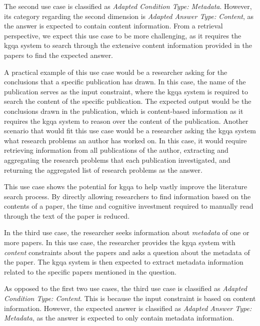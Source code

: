 The second use case is classified as \emph{Adapted Condition Type: Metadata}. However, its category regarding the second dimension is \emph{Adapted Answer Type: Content}, as the answer is expected to contain content information. From a retrieval perspective, we expect this use case to be more challenging, as it requires the \gls{kgqa} system to search through the extensive content information provided in the papers to find the expected answer.

A practical example of this use case would be a researcher asking for the conclusions that a specific publication has drawn. In this case, the name of the publication serves as the input constraint, where the \gls{kgqa} system is required to search the content of the specific publication. The expected output would be the conclusions drawn in the publication, which is content-based information as it requires the \gls{kgqa} system to reason over the content of the publication. Another scenario that would fit this use case would be a researcher asking the \gls{kgqa} system what research problems an author has worked on. In this case, it would require retrieving information from all publications of the author, extracting and aggregating the research problems that each publication investigated, and returning the aggregated list of research problems as the answer.

This use case shows the potential for \gls{kgqa} to help vastly improve the literature search process. By directly allowing researchers to find information based on the contents of a paper, the time and cognitive investment required to manually read through the text of the paper is reduced.

\begin{tcolorbox}[title=Use Case 3] %
In the third use case, the researcher seeks information about \emph{metadata} of one or more papers. In this use case, the researcher provides the \gls{kgqa} system with \emph{content} constraints about the papers and asks a question about the metadata of the paper. The \gls{kgqa} system is then expected to extract metadata information related to the specific papers mentioned in the question.
\end{tcolorbox}

As opposed to the first two use cases, the third use case is classified as \emph{Adapted Condition Type: Content}. This is because the input constraint is based on content information. However, the expected answer is classified as \emph{Adapted Answer Type: Metadata}, as the answer is expected to only contain metadata information.

